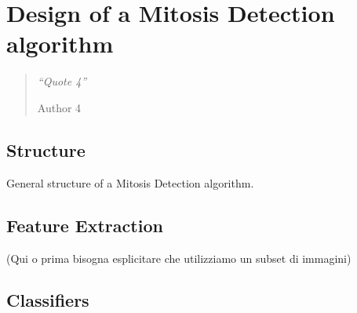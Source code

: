 \chapter{Design of a Mitosis Detection algorithm}
\label{chapter4}
\thispagestyle{empty}

\begin{quotation}
{\footnotesize
\noindent \emph{``Quote 4''}
\begin{flushright}
Author 4
\end{flushright}
}
\end{quotation}

\vspace{0.5cm}


\section{Structure}

General structure of a Mitosis Detection algorithm.

\vspace{0.5cm}

\section{Feature Extraction}

(Qui o prima bisogna esplicitare che utilizziamo un subset di immagini)

\section{Classifiers}

